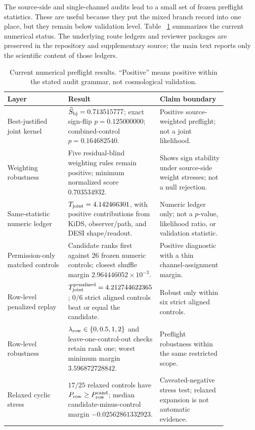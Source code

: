 \documentclass[11pt]{article}
\begin{document}
The source-side and single-channel audits lead to a small set of frozen
preflight statistics.  These are useful because they put the mixed branch
record into one place, but they remain below validation level.  Table
~\ref{tab:preflight-results} summarizes the current numerical status.  The
underlying route ledgers and reviewer packages are preserved in the repository
and supplementary source; the main text reports only the scientific content of
those ledgers.

\begin{table}[t]
\centering
\small
\caption{Current numerical preflight results.  ``Positive'' means positive
within the stated audit grammar, not cosmological validation.}
\label{tab:preflight-results}
\begin{tabular}{p{0.28\linewidth}p{0.29\linewidth}p{0.31\linewidth}}
\toprule
Layer & Result & Claim boundary \\
\midrule
Best-justified joint kernel &
\(\widehat S_{\rm bj}=0.713515777\); exact sign-flip
\(p=0.125000000\); combined-control \(p=0.164682540\). &
Positive source-weighted preflight; not a joint likelihood. \\
Weighting robustness &
Five residual-blind weighting rules remain positive; minimum normalized score
\(0.703534932\). &
Shows sign stability under source-side weight stresses; not a null rejection. \\
Same-statistic numeric ledger &
\(T_{\rm joint}=4.142466301\), with positive contributions from KiDS,
observer/path, and DESI shape/readout. &
Numeric ledger only; not a \(p\)-value, likelihood ratio, or validation
statistic. \\
Permission-only matched controls &
Candidate ranks first against \(26\) frozen numeric controls; closest
shuffle margin \(2.964446052\times10^{-3}\). &
Positive diagnostic with a thin channel-assignment margin. \\
Row-level penalized replay &
\(T_{\rm joint}^{\rm penalized}=4.212744622365\); \(0/6\) strict aligned
controls beat or equal the candidate. &
Robust only within six strict aligned controls. \\
Row-level robustness &
\(\lambda_{\rm row}\in\{0,0.5,1,2\}\) and leave-one-control-out checks retain
rank one; worst minimum margin \(3.596872728842\). &
Preflight robustness within the same restricted scope. \\
Relaxed cyclic stress &
\(17/25\) relaxed controls have \(P_{\rm row}\ge P_{\rm row}^{\rm cand}\);
median candidate-minus-control margin \(-0.02562861332923\). &
Caveated-negative stress test; relaxed expansion is not automatic evidence. \\
\bottomrule
\end{tabular}
\end{table}
\end{document}
